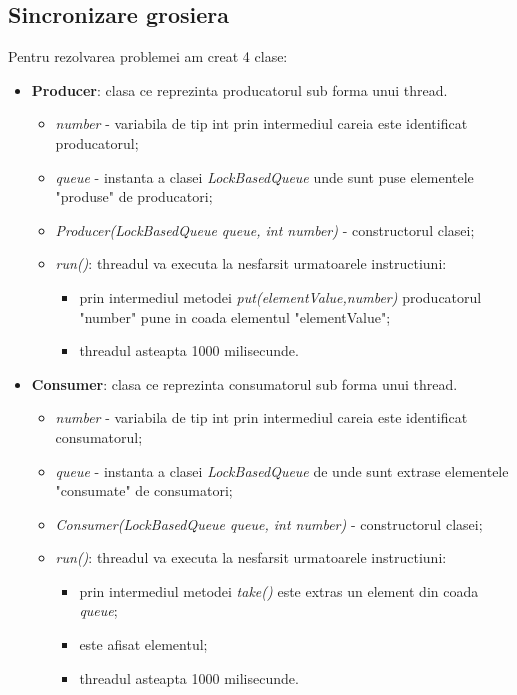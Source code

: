 \documentclass{article}
\begin{document}
\subsection{Sincronizare grosiera}
Pentru rezolvarea problemei am creat 4 clase:
\begin{itemize}
    \item \textbf{Producer}: clasa ce reprezinta producatorul sub forma unui thread.
    \begin{itemize}
        \item \textit{number} - variabila de tip int prin intermediul careia este identificat producatorul;
        \item \textit{queue} - instanta a clasei \textit{LockBasedQueue} unde sunt puse elementele "produse" de producatori;
        \item \textit{Producer(LockBasedQueue queue, int number)} - constructorul clasei;
        \item \textit{run()}: threadul va executa la nesfarsit urmatoarele instructiuni:
        \begin{itemize}
            \item prin intermediul metodei \textit{put(elementValue,number)} producatorul "number" pune in coada elementul "elementValue";
            \item threadul asteapta 1000 milisecunde.
        \end{itemize}
    \end{itemize}
    \item \textbf{Consumer}: clasa ce reprezinta consumatorul sub forma unui thread.
    \begin{itemize}
        \item \textit{number} - variabila de tip int prin intermediul careia este identificat consumatorul;
        \item \textit{queue} - instanta a clasei \textit{LockBasedQueue} de unde sunt extrase elementele "consumate" de consumatori;
        \item \textit{Consumer(LockBasedQueue queue, int number)} - constructorul clasei;
        \item \textit{run()}: threadul va executa la nesfarsit urmatoarele instructiuni:
        \begin{itemize}
            \item prin intermediul metodei \textit{take()} este extras un element din coada \textit{queue};
            \item este afisat elementul;
            \item threadul asteapta 1000 milisecunde.

\end{itemize}
\end{itemize}
\end{itemize}
\end{document}
